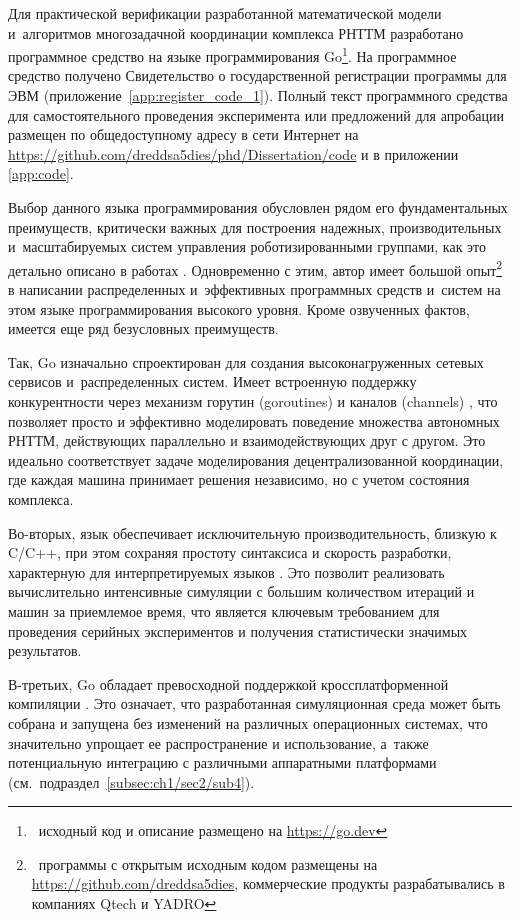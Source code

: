 Для практической верификации разработанной математической модели и~алгоритмов многозадачной координации комплекса РНТТМ разработано программное средство на языке программирования Go\footnote{\  исходный код и описание размещено на \url{https://go.dev}}. На программное средство получено Свидетельство о государственной регистрации программы для ЭВМ \cite{progbib1} (приложение~\ref{app:register_code_1}). Полный текст программного средства для самостоятельного проведения эксперимента или предложений для апробации размещен по общедоступному адресу в сети Интернет на \url{https://github.com/dreddsa5dies/phd/Dissertation/code} и в приложении \ref{app:code}.

Выбор данного языка программирования обусловлен рядом его фундаментальных преимуществ, критически важных для построения надежных, производительных и~масштабируемых систем управления роботизированными группами, как это детально описано в работах \cite{GoPractice, GoProfessional, GoLangDonovan, GoLangSumm}. Одновременно с этим, автор имеет большой опыт\footnote{\  программы с открытым исходным кодом размещены на \url{https://github.com/dreddsa5dies}, коммерческие продукты разрабатывались в компаниях Qtech и YADRO} в написании распределенных и~эффективных программных средств и~систем на этом языке программирования высокого уровня. Кроме озвученных фактов, имеется еще ряд безусловных преимуществ.

Так, Go изначально спроектирован для создания высоконагруженных сетевых сервисов и~распределенных систем. Имеет встроенную поддержку конкурентности через механизм горутин (goroutines) и каналов (channels) \cite{GoLangDonovan}, что позволяет просто и эффективно моделировать поведение множества автономных РНТТМ, действующих параллельно и взаимодействующих друг с другом. Это идеально соответствует задаче моделирования децентрализованной координации, где каждая машина принимает решения независимо, но с учетом состояния комплекса.

Во-вторых, язык обеспечивает исключительную производительность, близкую к C/C++, при этом сохраняя простоту синтаксиса и скорость разработки, характерную для интерпретируемых языков \cite{GoProfessional}. Это позволит реализовать вычислительно интенсивные симуляции с большим количеством итераций и машин за приемлемое время, что является ключевым требованием для проведения серийных экспериментов и получения статистически значимых результатов.

В-третьих, Go обладает превосходной поддержкой кроссплатформенной компиляции \cite{GoLangSumm}. Это означает, что разработанная симуляционная среда может быть собрана и запущена без изменений на различных операционных системах, что значительно упрощает ее распространение и использование, а~также потенциальную интеграцию с различными аппаратными платформами (см.~подраздел~\ref{subsec:ch1/sec2/sub4}).

